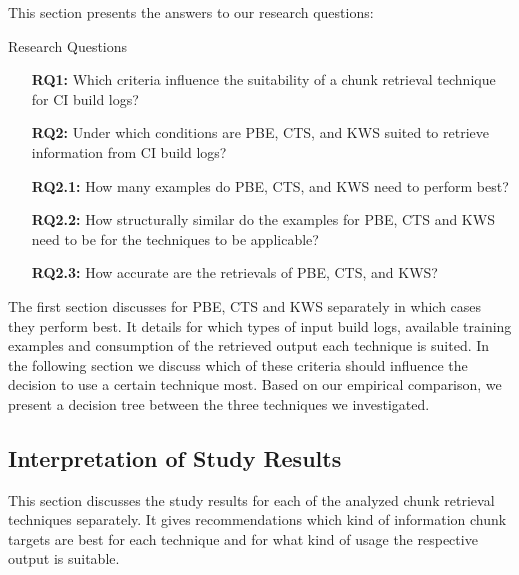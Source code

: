 This section presents the answers to our research questions:
\begin{simplebox}{Research Questions}
\begin{itemize}
 \item[\textbf{RQ1:}] Which criteria influence the suitability of a chunk retrieval technique for CI build logs?
  \item[\textbf{RQ2:}] Under which conditions are PBE, CTS, and KWS suited to retrieve information from CI build logs?
  \item[\textbf{RQ2.1:}] How many examples do PBE, CTS, and KWS need to perform best?
  \item[\textbf{RQ2.2:}] How structurally similar do the examples for PBE, CTS and KWS need to be for the techniques to be applicable?
  \item[\textbf{RQ2.3:}] How accurate are the retrievals of PBE, CTS, and KWS?
\end{itemize}
\end{simplebox}

The first section discusses for PBE, CTS and KWS separately in which cases they perform best.
It details for which types of input build logs, available training examples and consumption of the retrieved output each technique is suited.
In the following section we discuss which of these criteria should influence the decision to use a certain technique most.
Based on our empirical comparison, we present a decision tree between the three techniques we investigated.

\subsection{Interpretation of Study Results}
This section discusses the study results for each of the analyzed chunk retrieval techniques separately.
It gives recommendations which kind of information chunk targets are best for each technique and for what kind of usage the respective output is suitable.

